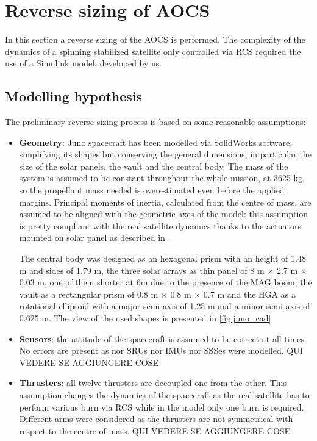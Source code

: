\section{Reverse sizing of AOCS}
\label{sec:AOCS_sizing}

In this section a reverse sizing of the AOCS is performed. The complexity of the dynamics of a spinning stabilized satellite only controlled via RCS required the use of a Simulink model, developed by us. 

\subsection{Modelling hypothesis}
\label{subsec: mod_hypo}
The preliminary reverse sizing process is based on some reasonable assumptions:

\begin{itemize}
    \item \textbf{Geometry}: Juno spacecraft has been modelled via SolidWorks software, simplifying its shapes but conserving the general dimensions, in particular the size of the solar panels, the vault and the central body. The mass of the system is assumed to be constant throughout the whole mission, at 3625 kg, so the propellant mass needed is overestimated even before the applied margins.     
    Principal moments of inertia, calculated from the centre of mass, are assumed to be aligned with the geometric axes of the model: this assumption is pretty compliant with the real satellite dynamics thanks to the actuators mounted on solar panel as described in \mref. 
       
    The central body was designed as an hexagonal prism with an height of 1.48 m and sides of 1.79 m, the three solar arrays as thin panel of 8 m $\times$ 2.7 m $\times$ 0.03 m, one of them shorter at 6m due to the presence of the MAG boom, the vault as a rectangular prism of 0.8 m $\times$ 0.8 m $\times$ 0.7 m and the HGA as a rotational ellipsoid with a major semi-axis of 1.25 m and a minor semi-axis of 0.625 m. 
    The view of the used shapes is presented in \autoref{fig:juno_cad}.

    \item \textbf{Sensors}: the attitude of the spacecraft is assumed to be correct at all times. No errors are present as nor SRUs nor IMUs nor SSSes were modelled. QUI VEDERE SE AGGIUNGERE COSE
    
    \item \textbf{Thrusters}: all twelve thrusters are decoupled one from the other. This assumption changes the  dynamics of the spacecraft as the real satellite has to perform various burn via RCS while in the model only one burn is required. %
    Different arms were considered as the thrusters are not symmetrical with respect to the centre of mass. QUI VEDERE SE AGGIUNGERE COSE


\end{itemize}
